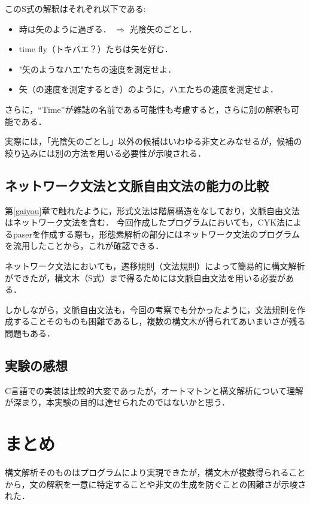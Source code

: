 \documentclass[uplatex, dvipdfmx, a4paper, twocolumn]{jsarticle}
\begin{document}
    このS式の解釈はそれぞれ以下である:
    \begin{itemize}
      \item 時は矢のように過ぎる． $\Rightarrow$ 光陰矢のごとし．
      \item time fly（トキバエ？）たちは矢を好む．
      \item "矢のようなハエ"たちの速度を測定せよ．
      \item 矢（の速度を測定するとき）のように，ハエたちの速度を測定せよ．
    \end{itemize}
    さらに，``Time''が雑誌の名前である可能性も考慮すると，さらに別の解釈も可能である．

    実際には，「光陰矢のごとし」以外の候補はいわゆる非文とみなせるが，候補の絞り込みには別の方法を用いる必要性が示唆される．

    \subsection{ネットワーク文法と文脈自由文法の能力の比較}
    第\ref{gaiyou}章で触れたように，形式文法は階層構造をなしており，文脈自由文法はネットワーク文法を含む．
    今回作成したプログラムにおいても，CYK法によるpaserを作成する際も，形態素解析の部分にはネットワーク文法のプログラムを流用したことから，これが確認できる．

    ネットワーク文法においても，遷移規則（文法規則）によって簡易的に構文解析ができたが，構文木（S式）まで得るためには文脈自由文法を用いる必要がある．

    しかしながら，文脈自由文法も，今回の考察でも分かったように，文法規則を作成することそのものも困難であるし，複数の構文木が得られてあいまいさが残る問題もある．

    \subsection{実験の感想}
    C言語での実装は比較的大変であったが，オートマトンと構文解析について理解が深まり，本実験の目的は達せられたのではないかと思う．

  \section{まとめ}\label{matome}
  構文解析そのものはプログラムにより実現できたが，構文木が複数得られることから，文の解釈を一意に特定することや非文の生成を防ぐことの困難さが示唆された．

  
  \flushcolsend
\end{document}
